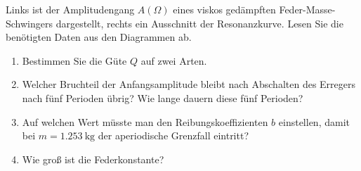 \begin{ExerciseBlock}
Links ist der Amplitudengang $A(\Omega)$ eines viskos gedämpften Feder-Masse-Schwingers dargestellt, rechts ein Ausschnitt der Resonanzkurve. Lesen Sie die benötigten Daten aus den Diagrammen ab.
\begin{center}
\end{center}
\begin{enumerate}
\item Bestimmen Sie die Güte $Q$ auf zwei Arten.
\item Welcher Bruchteil der Anfangsamplitude bleibt nach Abschalten des Erregers nach fünf Perioden übrig? Wie lange dauern diese fünf Perioden?
\item Auf welchen Wert müsste man den Reibungskoeffizienten $b$ einstellen, damit bei $m=\qty{1.253}{\kilogram}$ der aperiodische Grenzfall eintritt?
\item Wie groß ist die Federkonstante?
\end{enumerate}
\end{ExerciseBlock}
